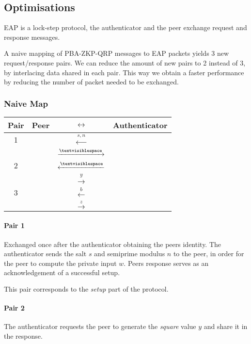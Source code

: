 \subsection{Optimisations}
EAP is a lock-step protocol, the authenticator and the peer exchange request and response messages.

A naive mapping of PBA-ZKP-QRP messages to EAP packets yields 3 new request/response pairs. 
We can reduce the amount of new pairs to 2 instead of 3, by interlacing data shared in each pair.
This way we obtain a faster performance by reducing the number of packet needed to be exchanged.

\subsubsection{Naive Map}

\begin{center}
	\begin{tabular}{c|rcl}
	Pair & Peer  & $\leftrightarrow$ & Authenticator \\
	\hline
	1 & & $\xleftarrow{s, n}$ &\\
	&& $\xrightarrow{\textvisiblespace}$&\\
	\hline
	2 & & $\xleftarrow{\textvisiblespace}$&\\
	&& $\xrightarrow{y}$&\\
	\hline
	3 & & $\xleftarrow{b}$&\\
	&& $\xrightarrow{z}$&\\
	\hline
	\end{tabular}
\end{center}

\paragraph{Pair 1} Exchanged once after the authenticator obtaining the peers identity. The authenticator sends the salt $s$ and semiprime modulus $n$ to the peer, in order for the peer to compute the private input $w$. 
Peers response serves as an acknowledgement of a successful setup.

This pair corresponds to the \textit{setup} part of the protocol.

\paragraph{Pair 2} The authenticator requests the peer to generate the \textit{square} value $y$ and share it in the response.

